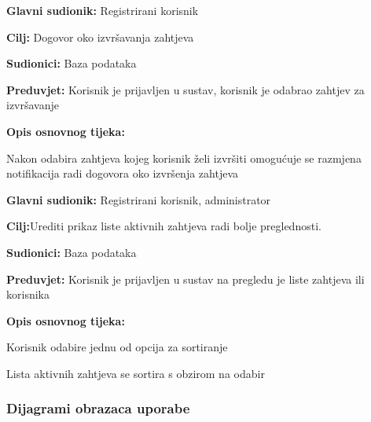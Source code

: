 \noindent {}
\begin{packed_item}
	\item \textbf{Glavni sudionik: } Registrirani korisnik
	\item  \textbf{Cilj:} Dogovor oko izvršavanja zahtjeva
	\item  \textbf{Sudionici:} Baza podataka
	\item  \textbf{Preduvjet:} Korisnik je prijavljen u sustav, korisnik je odabrao zahtjev za izvršavanje
	\item  \textbf{Opis osnovnog tijeka:}
	\item[] \begin{packed_enum}
		\item Nakon odabira zahtjeva kojeg korisnik želi izvršiti omogućuje se razmjena notifikacija radi dogovora oko izvršenja zahtjeva 
	\end{packed_enum}
\end{packed_item}
\newpage
\noindent {}
\begin{packed_item}
	\item \textbf{Glavni sudionik: }Registrirani korisnik, administrator
	\item  \textbf{Cilj:}Urediti prikaz liste aktivnih zahtjeva radi bolje preglednosti.
	\item  \textbf{Sudionici:} Baza podataka
	\item  \textbf{Preduvjet:} Korisnik je prijavljen u sustav na pregledu je liste zahtjeva ili korisnika
	\item  \textbf{Opis osnovnog tijeka:}
	
	\item[] \begin{packed_enum}
		
		\item 	Korisnik odabire jednu od opcija za sortiranje
		\item 	Lista aktivnih zahtjeva se sortira s obzirom na odabir
	\end{packed_enum}
\end{packed_item}


\newpage
\subsubsection{Dijagrami obrazaca uporabe}

